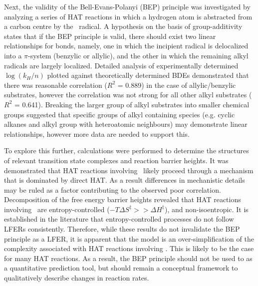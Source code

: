 \begin{doublespace}
Next, the validity of the Bell-Evans-Polanyi (BEP) principle was investigated by
analyzing a series of HAT reactions in which a hydrogen atom is abstracted from
a carbon centre by the \cumo\ radical. A hypothesis on the basis of
group-additivity states that if the BEP principle is valid, there should exist
two linear relationships for  bonds, namely, one in which the incipient
radical is delocalized into a $\pi$-system (benzylic or allylic), and the other
in which the remaining alkyl radicals are largely localized. Detailed analysis
of experimentally determined $\log(k_H/n)$ plotted against theoretically
determined  BDEs demonstrated that there was reasonable correlation
($R^2$ = 0.889) in the case of allylic/benzylic substrates, however the
correlation was not strong for all other alkyl substrates ($R^2$ = 0.641).
Breaking the larger group of alkyl substrates into smaller chemical groups
suggested that specific groups of alkyl containing species (e.g. cyclic alkanes
and alkyl group with heteroatomic neighbours) may demonstrate linear
relationships, however more data are needed to support this.

To explore this further, calculations were performed to determine the structures
of relevant transition state complexes and reaction barrier heights. It was
demonstrated that HAT reactions involving \cumo\ likely proceed through a
mechanism that is dominated by direct HAT. As a result differences in
mechanistic details may be ruled as a factor contributing to the observed poor
correlation. Decomposition of the free energy barrier heights revealed that HAT
reactions involving \cumo\ are entropy-controlled ($-T\Delta S^\ddagger >>
\Delta H^\ddagger$), and non-isoentropic. It is established in the literature
that entropy-controlled processes do not follow LFERs
consistently.\cite{Exner1973} Therefore, while these results do not invalidate
the BEP principle as a LFER, it is apparent that the model is an
over-simplification of the complexity associated with HAT reactions involving
\cumo. This is likely to be the case for many HAT reactions. As a result, the
BEP principle should not be used to as a quantitative prediction tool, but
should remain a conceptual framework to qualitatively describe changes in
reaction rates.


\end{doublespace}
